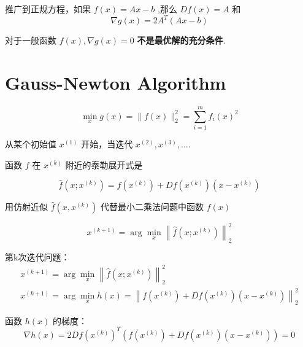 \begin{corollary}[正规方程的最优必要条件]
    推广到正规方程，如果 $ f(x)=A x-b $ ,那么 $ D f(x)=A $ 和
\begin{equation}
\nabla g(x)=2 A^{T}(A x-b)
\end{equation}
\end{corollary}

\begin{remark}
    对于一般函数 $ f(x), \nabla g(x)=0 $ \textbf{不是最优解的充分条件}.
\end{remark}



\section{Gauss-Newton Algorithm}

\begin{problem}
    \begin{equation}
\min _{x} g(x)=\|f(x)\|_{2}^{2}=\sum_{i=1}^{m} f_{i}(x)^{2}
\end{equation}

从某个初始值 $ x^{(1)} $ 开始，当迭代 $ x^{(2)}, x^{(3)}, \ldots $.
\end{problem}

函数 $ f $ 在 $ x^{(k)} $ 附近的泰勒展开式是

\begin{equation}
\hat{f}\left(x ; x^{(k)}\right)=f\left(x^{(k)}\right)+D f\left(x^{(k)}\right)\left(x-x^{(k)}\right)
\end{equation}

用仿射近似 $ \hat{f}\left(x, x^{(k)}\right) $ 代替最小二乘法问题中函数 $ f(x) $

\begin{equation}
x^{(k+1)}=\arg \min _{x}\left\|\hat{f}\left(x ; x^{(k)}\right)\right\|_{2}^{2}
\end{equation}

第k次迭代问题：
\begin{equation}
\begin{array}{c}
x^{(k+1)}=\arg \min _{x}\left\|\hat{f}\left(x ; x^{(k)}\right)\right\|_{2}^{2} \\
x^{(k+1)}=\arg \min _{x} h(x)=\left\|f\left(x^{(k)}\right)+D f\left(x^{(k)}\right)\left(x-x^{(k)}\right)\right\|_{2}^{2}
\end{array}
\end{equation}

函数 $ h(x) $ 的梯度：
\begin{equation}
\nabla h(x)=2 D f\left(x^{(k)}\right)^{T}\left(f\left(x^{(k)}\right)+D f\left(x^{(k)}\right)\left(x-x^{(k)}\right)\right)=0
\end{equation}

